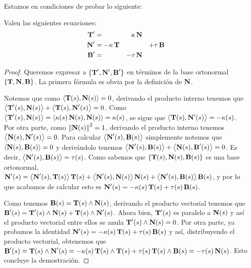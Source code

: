 Estamos en condiciones de probar lo siguiente:

\begin{teo} Valen las siguientes ecuaciones: 
\begin{align*}\T' &=          & \kappa&\N &      & \\
              \N' &=-\kappa\T &           &      &+\tau\B \\ 
							\B' &=          &  -\tau&\N &      &\end{align*}
\begin{proof} Queremos expresar a $\{\T',\N',\B'\}$ en términos de la base ortonormal $\{\T,\N,\B\}$. La primera fórmula es obvia por la definición de $\N$.

Notemos que como $\pint{\T(s),\N(s)}=0$, derivando el producto interno tenemos que $\pint{\T'(s),\N(s)}+\pint{\T(s),\N'(s)}=0$. Como $\pint{\T'(s),\N(s)}=\pint{\kappa(s)\N(s),\N(s)}=\kappa(s)$, se sigue que $\pint{\T(s),\N'(s)}=-\kappa(s)$. Por otra parte, como $\norm{\N(s)}^2=1$, derivando el producto interno tenemos $\pint{\N(s),\N'(s)}=0$. Para calcular $\pint{\N'(s),\B(s)}$ simplemente notemos que $\pint{\N(s),\B(s)}=0$ y derivándolo tenemos $\pint{\N'(s),\B(s)}+\pint{\N(s),\B'(s)}=0$. Es decir, $\pint{\N'(s),\B(s)}=\tau(s)$. Como sabemos que $\{\T(s),\N(s),\B(s)\}$ es una base ortonormal, $\N'(s)=\pint{\N'(s),\T(s)}\T(s)+\pint{\N'(s),\N(s)}\N(s)+\pint{\N'(s),\B(s)}\B(s)$, y por lo que acabamos de calcular esto es $\N'(s) = -\kappa(s)\T(s) + \tau(s)\B(s)$.

Como tenemos $\B(s)=\T(s)\wedge\N(s)$, derivando el producto vectorial tenemos que $\B'(s)=\T'(s)\wedge \N(s) + \T(s)\wedge \N'(s)$. Ahora bien, $\T'(s)$ es paralelo a $\N(s)$ y así el producto vectorial entre ellos se anula $\T'(s)\wedge\N(s)=0$. Por otra parte, ya probamos la identidad $\N'(s)=-\kappa(s)\T(s)+\tau(s)\B(s)$ y así, distribuyendo el producto vectorial, obtenemos que $\B'(s)=\T(s)\wedge \N'(s)=-\kappa(s) \T(s)\wedge\T(s) + \tau(s) \T(s)\wedge\B(s) = -\tau(s)\N(s)$. Esto concluye la demostración.
\end{proof}
\end{teo}

